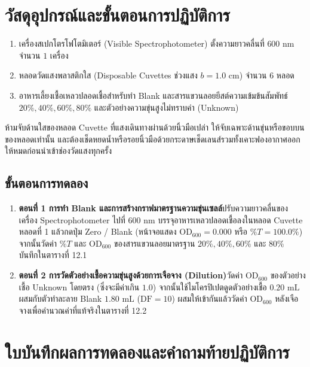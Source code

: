 \section{วัสดุอุปกรณ์และขั้นตอนการปฏิบัติการ}

\begin{equipbox}
\begin{enumerate}
    \item เครื่องสเปกโตรโฟโตมิเตอร์ (Visible Spectrophotometer) ตั้งความยาวคลื่นที่ $600\text{ nm}$ จำนวน $1$ เครื่อง
    \item หลอดวัดแสงพลาสติกใส (Disposable Cuvettes ช่วงแสง $b = 1.0\text{ cm}$) จำนวน $6$ หลอด
    \item อาหารเลี้ยงเชื้อเหลวปลอดเชื้อสำหรับทำ Blank และสารแขวนลอยยีสต์ความเข้มข้นสัมพัทธ์ $20\%, 40\%, 60\%, 80\%$ และตัวอย่างความขุ่นสูงไม่ทราบค่า (Unknown)
\end{enumerate}
\end{equipbox}

\begin{warningbox}
ห้ามจับด้านใสของหลอด Cuvette ที่แสงเดินทางผ่านด้วยนิ้วมือเปล่า ให้จับเฉพาะด้านขุ่นหรือขอบบนของหลอดเท่านั้น และต้องเช็ดหยดน้ำหรือรอยนิ้วมือด้วยกระดาษเช็ดเลนส์รวมทั้งเคาะฟองอากาศออกให้หมดก่อนนำเข้าช่องวัดแสงทุกครั้ง
\end{warningbox}

\subsection{ขั้นตอนการทดลอง}
\begin{enumerate}
    \item \textbf{ตอนที่ 1 การทำ Blank และการสร้างกราฟมาตรฐานความขุ่นเซลล์}\quad ปรับความยาวคลื่นของเครื่อง Spectrophotometer ไปที่ $600\text{ nm}$ บรรจุอาหารเหลวปลอดเชื้อลงในหลอด Cuvette หลอดที่ 1 แล้วกดปุ่ม Zero / Blank (หน้าจอแสดง $\text{OD}_{600} = 0.000$ หรือ $\%T = 100.0\%$) จากนั้นวัดค่า $\%T$ และ $\text{OD}_{600}$ ของสารแขวนลอยมาตรฐาน $20\%, 40\%, 60\%$ และ $80\%$ บันทึกใน\mbox{ตารางที่} 12.1
    \item \textbf{ตอนที่ 2 การวัดตัวอย่างเชื้อความขุ่นสูงด้วยการเจือจาง (Dilution)}\quad วัดค่า $\text{OD}_{600}$ ของตัวอย่างเชื้อ Unknown โดยตรง (ซึ่งจะมีค่าเกิน $1.0$) จากนั้นใช้ไมโครปิเปตดูดตัวอย่างเชื้อ $0.20\text{ mL}$ ผสมกับตัวทำละลาย Blank $1.80\text{ mL}$ ($\text{DF} = 10$) ผสมให้เข้ากันแล้ววัดค่า $\text{OD}_{600}$ หลังเจือจางเพื่อคำนวณค่าที่แท้จริงใน\mbox{ตารางที่} 12.2
\end{enumerate}

\section{ใบบันทึกผลการทดลองและคำถามท้ายปฏิบัติการ}

